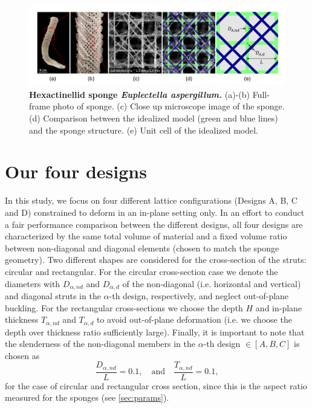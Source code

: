 \documentclass[10pt,twoside]{fernandes_supp}
\begin{document}
\begin{figure}
    \centering
    \includegraphics[width=0.9\linewidth]{SFig1.png}
    \caption{\textbf{Hexactinellid sponge \textit{Euplectella aspergillum.}} (a)-(b) Full-frame photo of sponge.  (c)  Close up microscope image of the sponge. (d) Comparison between the idealized model (green and blue lines) and the sponge structure. (e) Unit cell of the idealized model.}
    \label{Sponge}
\end{figure}

\section{Our four designs}\label{sec:designs}
In this study, we focus on four different lattice configurations (Designs A, B, C and D) constrained to deform in an in-plane setting only. In an effort to conduct a fair performance comparison between the different designs, all four designs are characterized by the same total volume of material and a fixed volume ratio between non-diagonal and diagonal elements (chosen to match the sponge geometry).  Two different shapes are considered for the cross-section of the struts: circular and rectangular.  For the circular cross-section case  we denote the diameters with $D_{\alpha,nd}$ and $D_{\alpha,d}$ of the non-diagonal (i.e. horizontal and vertical) and diagonal struts in the $\alpha$-th design, respectively, and neglect out-of-plane buckling. For the rectangular cross-sections we choose the depth $H$ and in-plane thickness $T_{\alpha,nd}$ and $T_{\alpha,d}$  to avoid out-of-plane deformation (i.e. we choose the  depth over thickness ratio sufficiently large). Finally, it is important to note that the slenderness of the non-diagonal members in the $\alpha$-th design $\in [A,B,C]$ is chosen as 
\begin{equation}
\frac{D_{\alpha,nd}}{L}=0.1,\quad\text{and}\quad\frac{T_{\alpha,nd}}{L}=0.1,
\end{equation}
for the case of circular and rectangular cross section, since this is the aspect ratio measured for the sponges (see \cref{sec:params}).
\end{document}
